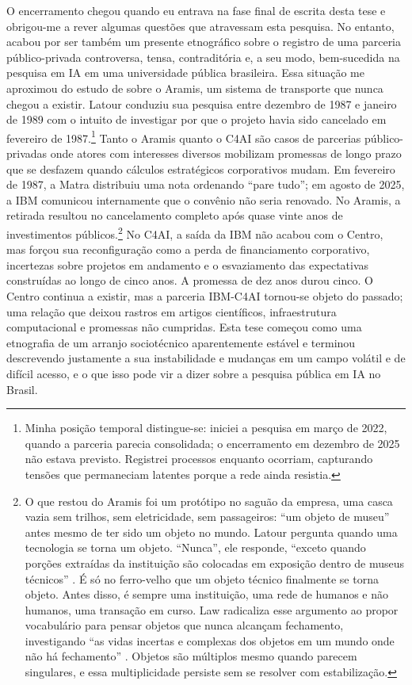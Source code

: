 O encerramento chegou quando eu entrava na fase final de escrita desta tese e obrigou-me a rever algumas questões que atravessam esta pesquisa. No entanto, acabou por ser também um presente etnográfico sobre o registro de uma parceria público-privada controversa, tensa, contraditória e, a seu modo, bem-sucedida na pesquisa em IA em uma universidade pública brasileira. Essa situação me aproximou do estudo de \textcite{Latour1993Aramis} sobre o Aramis, um sistema de transporte que nunca chegou a existir. Latour conduziu sua pesquisa entre dezembro de 1987 e janeiro de 1989 com o intuito de investigar por que o projeto havia sido cancelado em fevereiro de 1987.\footnote{Minha posição temporal distingue-se: iniciei a pesquisa em março de 2022, quando a parceria parecia consolidada; o encerramento em dezembro de 2025 não estava previsto. Registrei processos enquanto ocorriam, capturando tensões que permaneciam latentes porque a rede ainda resistia.} Tanto o Aramis quanto o C4AI são casos de parcerias público-privadas onde atores com interesses diversos mobilizam promessas de longo prazo que se desfazem quando cálculos estratégicos corporativos mudam. Em fevereiro de 1987, a Matra distribuiu uma nota ordenando ``pare tudo''; em agosto de 2025, a IBM comunicou internamente que o convênio não seria renovado. No Aramis, a retirada resultou no cancelamento completo após quase vinte anos de investimentos públicos.\footnote{O que restou do Aramis foi um protótipo no saguão da empresa, uma casca vazia sem trilhos, sem eletricidade, sem passageiros: ``um objeto de museu'' antes mesmo de ter sido um objeto no mundo. Latour pergunta quando uma tecnologia se torna um objeto. ``Nunca'', ele responde, ``exceto quando porções extraídas da instituição são colocadas em exposição dentro de museus técnicos'' \parencite[p. 9]{Latour1993Aramis}. É só no ferro-velho que um objeto técnico finalmente se torna objeto. Antes disso, é sempre uma instituição, uma rede de humanos e não humanos, uma transação em curso. Law radicaliza esse argumento ao propor vocabulário para pensar objetos que nunca alcançam fechamento, investigando ``as vidas incertas e complexas dos objetos em um mundo onde não há fechamento'' \parencite[p. 59]{Law2004After}. Objetos são múltiplos mesmo quando parecem singulares, e essa multiplicidade persiste sem se resolver com estabilização.} No C4AI, a saída da IBM não acabou com o Centro, mas forçou sua reconfiguração como a perda de financiamento corporativo, incertezas sobre projetos em andamento e o esvaziamento das expectativas construídas ao longo de cinco anos. A promessa de dez anos durou cinco. O Centro continua a existir, mas a parceria IBM-C4AI tornou-se objeto do passado; uma relação que deixou rastros em artigos científicos, infraestrutura computacional e promessas não cumpridas. Esta tese começou como uma etnografia de um arranjo sociotécnico aparentemente estável e terminou descrevendo justamente a sua instabilidade e mudanças em um campo volátil e de difícil acesso, e o que isso pode vir a dizer sobre a pesquisa pública em IA no Brasil.

